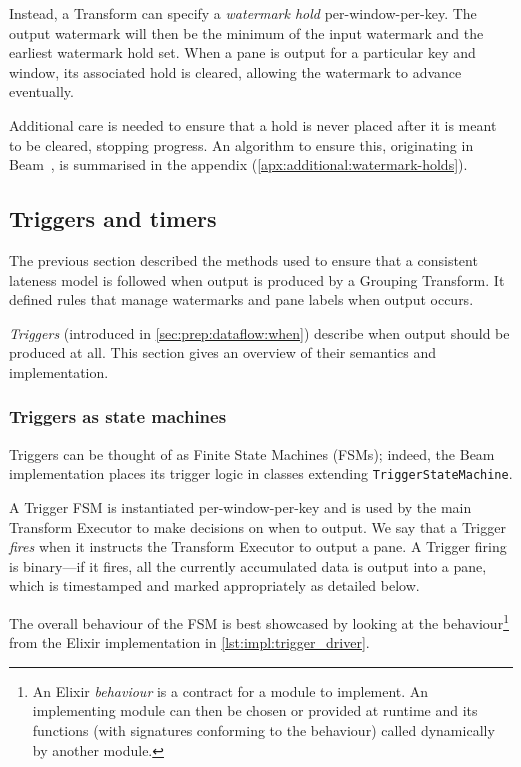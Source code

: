 Instead, a Transform can specify a \emph{watermark hold} per-window-per-key.
The output watermark will then be the minimum of the input watermark and the earliest watermark hold set.
When a pane is output for a particular key and window, its associated hold is cleared, allowing the watermark to advance eventually.

Additional care is needed to ensure that a hold is never placed after it is meant to be cleared, stopping progress.
An algorithm to ensure this, originating in Beam~\cite{BEAM-code-WatermarkManager}, is summarised in the appendix (\cref{apx:additional:watermark-holds}).

\subsection{Triggers and timers}\label{sec:impl:dataflow:triggers-timers}

The previous section described the methods used to ensure that a consistent lateness model is followed when output is produced by a Grouping Transform.
It defined rules that manage watermarks and pane labels when output occurs.

\emph{Triggers} (introduced in \cref{sec:prep:dataflow:when}) describe when output should be produced at all.
This section gives an overview of their semantics and implementation.

\subsubsection{Triggers as state machines}
Triggers can be thought of as Finite State Machines (FSMs); indeed, the Beam implementation places its trigger logic in classes extending \verb|TriggerStateMachine|.

A Trigger FSM is instantiated per-window-per-key and is used by the main Transform Executor to make decisions on when to output.
We say that a Trigger \emph{fires} when it instructs the Transform Executor to output a pane.
A Trigger firing is binary---if it fires, all the currently accumulated data is output into a pane, which is timestamped and marked appropriately as detailed below.

The overall behaviour of the FSM is best showcased by looking at the  behaviour\footnote{An Elixir \emph{behaviour} is a contract for a module to implement. An implementing module can then be chosen or provided at runtime and its functions (with signatures conforming to the behaviour) called dynamically by another module.} from the Elixir implementation in \cref{lst:impl:trigger_driver}.

